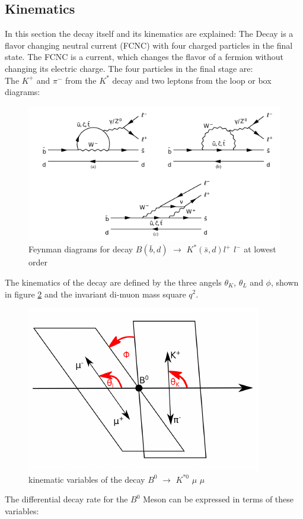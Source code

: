 \documentclass[english]{uzhpub}
\begin{document}
\subsection{Kinematics} \label{sec:Kinematics}
In this section the decay itself and its kinematics are explained:
The Decay is a flavor changing neutral current (FCNC) with four charged particles in the final state. The FCNC is a current, which changes the flavor of a fermion without changing its electric charge. The four particles in the final stage are:  \\
The $K^+$ and $\pi^-$ from the $K^{*}$ decay and two leptons from the loop or box diagrams:
\begin{figure}[H]
 \centering
 \includegraphics[width=0.8\linewidth]{KstarFeynman}
 \caption{Feynman diagrams for decay $B(\bar{b},d)$ $\rightarrow$ $ K^*(\bar{s},d) l^+$ $l^-$ at lowest order}
 \label{fig:Feynman}
\end{figure}
The kinematics of the decay are defined by the three angels $\theta_K$, $\theta_L$ and $\phi$, shown in figure \ref{fig:angels} and the invariant di-muon mass square $q^2$.
\begin{figure}[H]
 \centering
 \includegraphics[width=0.6\linewidth]{angels}
 \caption{kinematic variables of the decay $B^0$ $\rightarrow$ $K^{*0}$ $\mu$ $\mu$}
 \label{fig:angels}
\end{figure}
The differential decay rate for the $B^0$ Meson can be expressed in terms of these variables:
\end{document}
